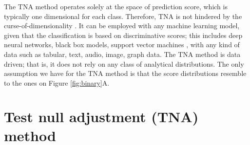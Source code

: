 \documentclass{article}
\newcommand{\todo}[2]{{\color{red} {\bf TODO-#1}: #2}}
\begin{document}

The TNA method operates solely at the space of prediction score, which is typically one dimensional for each class. Therefore, TNA is not hindered by the curse-of-dimensionality \cite{donoho2000high}. It can be employed with any machine learning model, given that the classification is based on discriminative scores; this includes deep neural networks, black box models, support vector machines \cite{cristianini2000introduction}, with any kind of data such as tabular, text, audio, image, graph data. The TNA method is data driven; that is, it does not rely on any class of analytical distributions. The only assumption we have for the TNA method is that the score distributions resemble to the ones on Figure \ref{fig:binary}A.



\section{Test null adjustment (TNA) method}
\end{document}
